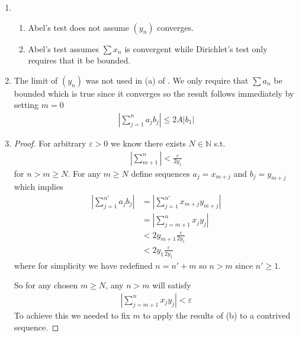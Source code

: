 \begin{enumerate}[label=(\alph*)]
    \item 
    \begin{enumerate}[label=(\roman*)]
        \item 
        Abel's test does not assume $(y_n)$ converges.

        \item
        Abel's test assumes $\sum x_n$ is convergent while Dirichlet's
        test only requires that it be bounded.
    \end{enumerate}

    \item 
    The limit of $(y_n)$ was not used in (a) of . We only 
    require that $\sum a_n$ be bounded which is true since it converges 
    so the result follows immediately by setting $m=0$
    \begin{align*}
        |\sum_{j=1}^n a_j b_j| \leq 2A |b_{1}| 
    \end{align*}

    \item 
    \begin{proof}
        For arbitrary $\varepsilon > 0$ we know there exists 
        $N \in \mathbb{N}$ s.t.
        \begin{align*}
            |\sum_{m+1}^n| < \frac{\varepsilon}{2y_1}
        \end{align*}
        for $n > m \geq N$. For any $m \geq N$
        define sequences $a_j = x_{m+j}$ and $b_j = y_{m+j}$
        which implies 
        \begin{align*}
            |\sum_{j=1}^{n'} a_j b_j| &= |\sum_{j=1}^{n'} x_{m+j} y_{m+j}| \\
            &= |\sum_{j=m+1}^{n} x_{j} y_{j}| \\
            &< 2y_{m+1} \frac{\varepsilon}{2y_1} \\
            &< 2y_{1} \frac{\varepsilon}{2y_1}
        \end{align*}
        where for simplicity we have redefined $n=n'+m$ so $n > m$
        since $n'\geq 1$.

        So for any chosen $m\geq N$, any $n>m$ will satisfy 
        \begin{align*}
            |\sum_{j=m+1}^{n} x_{j} y_{j}| < \varepsilon
        \end{align*}
        To achieve this we needed to fix $m$ to apply the results of (b)
        to a contrived sequence.
    \end{proof}
\end{enumerate}